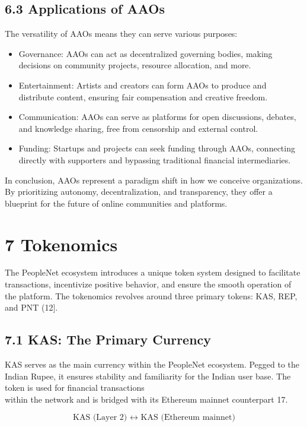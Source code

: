 \documentclass[10pt]{article}
\begin{document}
\subsection*{6.3 Applications of AAOs}
The versatility of AAOs means they can serve various purposes:

\begin{itemize}
  \item Governance: AAOs can act as decentralized governing bodies, making decisions on community projects, resource allocation, and more.
  \item Entertainment: Artists and creators can form AAOs to produce and distribute content, ensuring fair compensation and creative freedom.
  \item Communication: AAOs can serve as platforms for open discussions, debates, and knowledge sharing, free from censorship and external control.
  \item Funding: Startups and projects can seek funding through AAOs, connecting directly with supporters and bypassing traditional financial intermediaries.
\end{itemize}

In conclusion, AAOs represent a paradigm shift in how we conceive organizations. By prioritizing autonomy, decentralization, and transparency, they offer a blueprint for the future of online communities and platforms.

\section*{7 Tokenomics}
The PeopleNet ecosystem introduces a unique token system designed to facilitate transactions, incentivize positive behavior, and ensure the smooth operation of the platform. The tokenomics revolves around three primary tokens: KAS, REP, and PNT (12].

\subsection*{7.1 KAS: The Primary Currency}
KAS serves as the main currency within the PeopleNet ecosystem. Pegged to the Indian Rupee, it ensures stability and familiarity for the Indian user base. The token is used for financial transactions\\
within the network and is bridged with its Ethereum mainnet counterpart 17.


\begin{equation*}
\text { KAS (Layer 2) } \leftrightarrow \text { KAS (Ethereum mainnet) } \tag{3}
\end{equation*}
\end{document}
